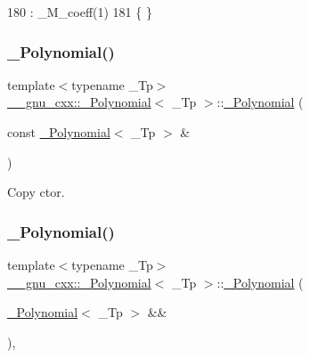 \begin{DoxyCode}
180       : \_M\_coeff(1)
181       \{ \}
\end{DoxyCode}
\mbox{\label{class____gnu__cxx_1_1__Polynomial_ac0a657bc804f3db8a03acfd1b98abb39}} 
\subsubsection{\texorpdfstring{\+\_\+\+Polynomial()}{\_Polynomial()}\hspace{0.1cm}{\footnotesize\ttfamily [2/9]}}
{\footnotesize\ttfamily template$<$typename \+\_\+\+Tp$>$ \\
\hyperlink{class____gnu__cxx_1_1__Polynomial}{\+\_\+\+\_\+gnu\+\_\+cxx\+::\+\_\+\+Polynomial}$<$ \+\_\+\+Tp $>$\+::\hyperlink{class____gnu__cxx_1_1__Polynomial}{\+\_\+\+Polynomial} (\begin{DoxyParamCaption}\item[{const \hyperlink{class____gnu__cxx_1_1__Polynomial}{\+\_\+\+Polynomial}$<$ \+\_\+\+Tp $>$ \&}]{ }\end{DoxyParamCaption})\hspace{0.3cm}{\ttfamily [default]}}

Copy ctor. \mbox{\label{class____gnu__cxx_1_1__Polynomial_a87bad90934c9752b51cdece15a5b369f}} 
\subsubsection{\texorpdfstring{\+\_\+\+Polynomial()}{\_Polynomial()}\hspace{0.1cm}{\footnotesize\ttfamily [3/9]}}
{\footnotesize\ttfamily template$<$typename \+\_\+\+Tp$>$ \\
\hyperlink{class____gnu__cxx_1_1__Polynomial}{\+\_\+\+\_\+gnu\+\_\+cxx\+::\+\_\+\+Polynomial}$<$ \+\_\+\+Tp $>$\+::\hyperlink{class____gnu__cxx_1_1__Polynomial}{\+\_\+\+Polynomial} (\begin{DoxyParamCaption}\item[{\hyperlink{class____gnu__cxx_1_1__Polynomial}{\+\_\+\+Polynomial}$<$ \+\_\+\+Tp $>$ \&\&}]{ }\end{DoxyParamCaption})\hspace{0.3cm}{\ttfamily [default]}, {\ttfamily [noexcept]}}


